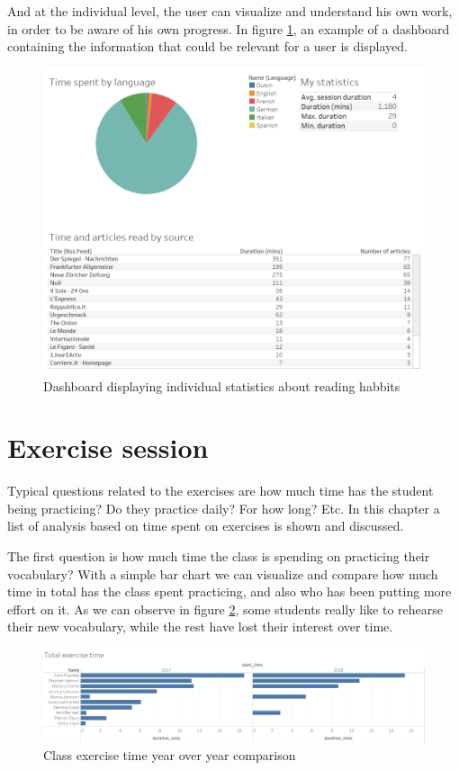 And at the individual level, the user can visualize and understand his own work, in order to be aware of his own progress. In figure \ref{fig:Personal_dashboard}, an example of a dashboard containing the information that could be relevant for a user is displayed.

\begin{figure}[!htb]
	\centering
	\includegraphics[width=1\linewidth]{gfx/Personal_dashboard}
	\caption{Dashboard displaying individual statistics about reading habbits}
	\label{fig:Personal_dashboard}
\end{figure}



\section{Exercise session}
Typical questions related to the exercises are how much time has the student being practicing? Do they practice daily? For how long? Etc. In this chapter a list of analysis based on time spent on exercises is shown and discussed.

The first question is how much time the class is spending on practicing their vocabulary? With a simple bar chart we can visualize and compare how much time in total has the class spent practicing, and also who has been putting more effort on it. As we can observe in figure \ref{fig:Total_exercise_time}, some students really like to rehearse their new vocabulary, while the rest have lost their interest over time.

\begin{figure}[bth]
	\centering
	\includegraphics[width=1\linewidth]{gfx/Total_exercise_time}
	\caption{Class exercise time year over year comparison}
	\label{fig:Total_exercise_time}
\end{figure}


